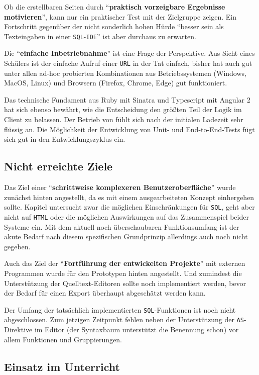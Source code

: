 Ob die erstellbaren Seiten durch "`\textbf{praktisch vorzeigbare Ergebnisse motivieren}"', kann nur ein praktischer Test mit der Zielgruppe zeigen. Ein Fortschritt gegenüber der nicht sonderlich hohen Hürde "`besser sein als Texteingaben in einer \texttt{SQL}-\texttt{IDE}"' ist aber durchaus zu erwarten.

Die "`\textbf{einfache Inbetriebnahme}"' ist eine Frage der Perspektive. Aus Sicht eines Schülers ist der einfache Aufruf einer \texttt{URL} in der Tat einfach, bisher hat \idename{} auch gut unter allen ad-hoc probierten Kombinationen aus Betriebssystemen (Windows, Mac\-OS, Linux) und Browsern (Firefox, Chrome, Edge) gut funktioniert.

Das technische Fundament aus Ruby mit Sinatra und Typescript mit Angular 2 hat sich ebenso bewährt, wie die Entscheidung den größten Teil der Logik im Client zu belassen. Der Betrieb von \idename{} fühlt sich nach der initialen Ladezeit sehr flüssig an. Die Möglichkeit der Entwicklung von Unit- und End-to-End-Tests fügt sich gut in den Entwicklungszyklus ein.

\subsection{Nicht erreichte Ziele}

Das Ziel einer "`\textbf{schrittweise komplexeren Benutzeroberfläche}"' wurde zunächst hinten angestellt, da es mit einem ausgearbeiteten Konzept einhergehen sollte. Kapitel  untersucht zwar die möglichen Einschränkungen für \texttt{SQL}, geht aber nicht auf \texttt{HTML} oder die möglichen Auswirkungen auf das Zusammenspiel beider Systeme ein. Mit dem aktuell noch überschaubaren Funktionsumfang ist der akute Bedarf nach diesem spezifischen Grundprinzip allerdings auch noch nicht gegeben.

Auch das Ziel der "`\textbf{Fortführung der entwickelten Projekte}"' mit externen Programmen wurde für den Prototypen hinten angestellt. Und zumindest die Unterstützung der Quelltext-Editoren sollte noch implementiert werden, bevor der Bedarf für einen Export überhaupt abgeschätzt werden kann.

Der Umfang der tatsächlich implementierten \texttt{SQL}-Funktionen ist noch nicht abgeschlossen. Zum jetzigen Zeitpunkt fehlen neben der Unterstützung der \texttt{AS}-Direktive im Editor (der Syntaxbaum unterstützt die Benennung schon) vor allem Funktionen und Gruppierungen.

\subsection{Einsatz im Unterricht}

